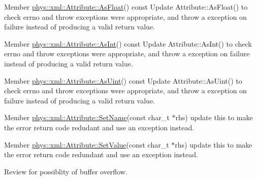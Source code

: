 \label{dd/da0/todo__todo000047}
\hypertarget{dd/da0/todo__todo000047}{}
 
\begin{DoxyDescription}
\item[Member \hyperlink{classphys_1_1xml_1_1Attribute_aad74f805b9318735011d698ee39113aa}{phys::xml::Attribute::AsFloat}() const  ]Update Attribute::AsFloat() to check errno and throw exceptions were appropriate, and throw a exception on failure instead of producing a valid return value. 
\end{DoxyDescription}

\label{dd/da0/todo__todo000044}
\hypertarget{dd/da0/todo__todo000044}{}
 
\begin{DoxyDescription}
\item[Member \hyperlink{classphys_1_1xml_1_1Attribute_ada1f2e45ce636ad8482972263364e7fa}{phys::xml::Attribute::AsInt}() const  ]Update Attribute::AsInt() to check errno and throw exceptions were appropriate, and throw a exception on failure instead of producing a valid return value. 
\end{DoxyDescription}

\label{dd/da0/todo__todo000045}
\hypertarget{dd/da0/todo__todo000045}{}
 
\begin{DoxyDescription}
\item[Member \hyperlink{classphys_1_1xml_1_1Attribute_ad00ec5857fc4afcda892a0057419a9a0}{phys::xml::Attribute::AsUint}() const  ]Update Attribute::AsUint() to check errno and throw exceptions were appropriate, and throw a exception on failure instead of producing a valid return value. 
\end{DoxyDescription}

\label{dd/da0/todo__todo000048}
\hypertarget{dd/da0/todo__todo000048}{}
 
\begin{DoxyDescription}
\item[Member \hyperlink{classphys_1_1xml_1_1Attribute_af669654308122897f98858563375bf4c}{phys::xml::Attribute::SetName}(const char\_\-t $\ast$rhs) ]update this to make the error return code redudant and use an exception instead. 
\end{DoxyDescription}

\label{dd/da0/todo__todo000037}
\hypertarget{dd/da0/todo__todo000037}{}
 
\begin{DoxyDescription}
\item[Member \hyperlink{classphys_1_1xml_1_1Attribute_a470512fcd8b4f7609319bf85df100aaa}{phys::xml::Attribute::SetValue}(const char\_\-t $\ast$rhs) ]update this to make the error return code redundant and use an exception instead. 

Review for possiblity of buffer overflow. 
\end{DoxyDescription}

